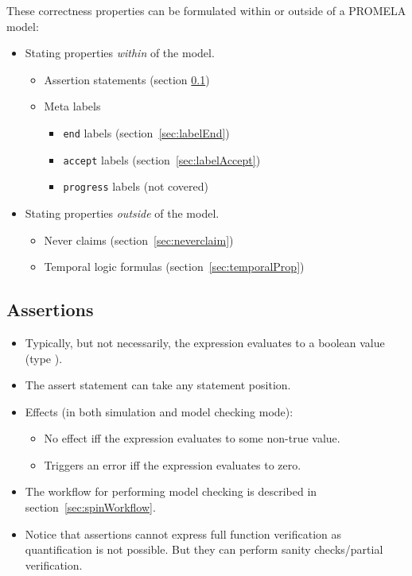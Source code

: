 		These correctness properties can be formulated within or outside of a PROMELA model:
		\begin{itemize}
			\item Stating properties \textit{within} of the model.
				\begin{itemize}
					\item Assertion statements (section \ref{sec:assert})
					\item Meta labels
						\begin{itemize}
							\item \texttt{end} labels (section~\ref{sec:labelEnd})
							\item \texttt{accept} labels (section~\ref{sec:labelAccept})
							\item \texttt{progress} labels (not covered) %
						\end{itemize}
				\end{itemize}
			\item Stating properties \textit{outside} of the model.
				\begin{itemize}
					\item Never claims (section~\ref{sec:neverclaim})
					\item Temporal logic formulas (section~\ref{sec:temporalProp})
				\end{itemize}
		\end{itemize}

		\subsection{Assertions}
			\label{sec:assert}
		
		
			\begin{itemize}
				\item Typically, but not necessarily, the expression evaluates to a boolean value (type ).
				\item The assert statement can take any statement position.
				\item Effects (in both simulation and model checking mode):
					\begin{itemize}
						\item No effect iff the expression evaluates to some non-true value.
						\item Triggers an error iff the expression evaluates to zero.
					\end{itemize}
				\item The workflow for performing model checking is described in section~\ref{sec:spinWorkflow}.
				\item Notice that assertions cannot express full function verification as quantification is not possible. But they can perform sanity checks/partial verification.
			\end{itemize}
		
